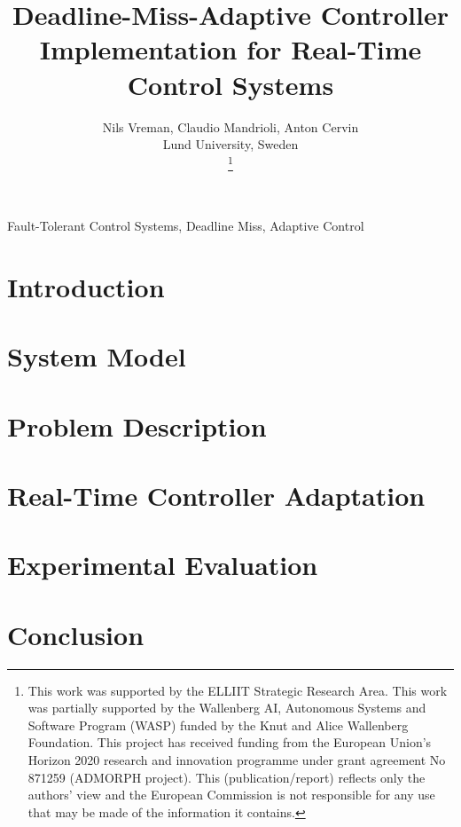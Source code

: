 \documentclass[conference]{IEEEtran}
\title{Deadline-Miss-Adaptive Controller Implementation for Real-Time Control Systems}
\author{Nils Vreman, Claudio Mandrioli, Anton Cervin\\
Lund University, Sweden\\
\thanks{This work was supported by the ELLIIT Strategic Research Area.
This work was partially supported by the Wallenberg AI, Autonomous Systems and Software Program (WASP) funded by the Knut and Alice Wallenberg Foundation.
This project has received funding from the European Union's Horizon 2020 research and innovation programme under grant agreement No 871259 (ADMORPH project). This (publication/report) reflects only the authors' view and the European Commission is not responsible for any use that may be made of the information it contains.}
}
\begin{document}
\makeatletter
\def\@artifactstamptop{0.1cm}
\def\@artifactstampright{0.1cm}
\def\@artifactstampwidth{2.5cm}
\let\@aetitle\@maketitle
\def\@maketitle{
\begin{tikzpicture}[remember picture,overlay,shift={(current page.north east)}]%
\node[anchor=north east,xshift=-\@artifactstampright,yshift=-\@artifactstamptop]{\texttt{[image: badge\_rtas\_AE]}};%
\end{tikzpicture}%
\@aetitle}
\makeatother

\maketitle




\begin{IEEEkeywords}
Fault-Tolerant Control Systems, Deadline Miss, Adaptive Control
\end{IEEEkeywords}

\section{Introduction}
\label{sec:intro}


\section{System Model}
\label{sec:sys-model}


\section{Problem Description}
\label{sec:problem-descr}


\section{Real-Time Controller Adaptation}
\label{sec:darc}


\section{Experimental Evaluation}
\label{sec:results}


\section{Conclusion}
\label{sec:conclusion}




\end{document}
